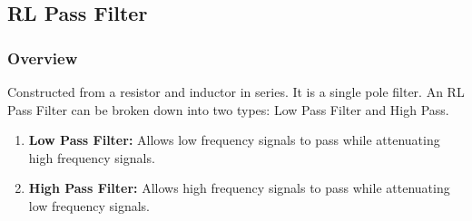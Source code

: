 \subsection{RL Pass Filter}

\subsubsection{Overview}
Constructed from a resistor and inductor in series. It
is a single pole filter. An RL Pass Filter can be broken
down into two types: Low Pass Filter and High Pass.
\begin{enumerate}
  \item \textbf{Low Pass Filter:} Allows low frequency
    signals to pass while attenuating high frequency
    signals.
  \item \textbf{High Pass Filter:} Allows high frequency
    signals to pass while attenuating low frequency
    signals.
\end{enumerate}

